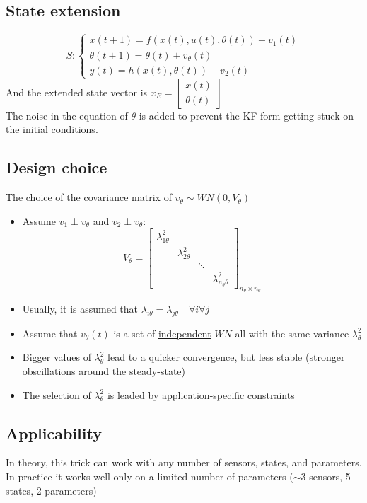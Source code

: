 \documentclass{report}
\begin{document}
\subsection{State extension}
\[
S:\begin{cases}
x(t+1)=f(x(t),u(t),\theta(t))+v_1(t)\\
\theta(t+1)=\theta(t)+v_\theta(t)\\
y(t)=h(x(t),\theta(t))+v_2(t)
\end{cases}
\]
And the extended state vector is $x_E=\begin{bmatrix}
x(t)\\\theta(t)
\end{bmatrix}
$\\
The noise in the equation of $\theta$ is added to prevent the KF form getting stuck on the initial conditions.
\subsection{Design choice} The choice of the covariance matrix of $v_\theta\sim WN(0,V_\theta)$\\
\begin{itemize}
\item Assume $v_1\perp v_\theta$ and $v_2\perp v_\theta$:
\[
V_\theta=\begin{bmatrix}
\lambda_{1\theta}^2\\
&\lambda_{2\theta}^2\\
&&\ddots\\
&&&\lambda_{n_\theta \theta}^2
\end{bmatrix}_{n_\theta \times n_\theta}
\]
\item Usually, it is assumed that $\lambda_{i\theta}=\lambda_{j\theta} \quad \forall i \forall j$
\item Assume that $v_\theta(t)$ is a set of \underline{independent} $WN$ all with the same variance $\lambda_\theta^2$
\item Bigger values of $\lambda_\theta^2$ lead to a quicker convergence, but less stable (stronger obscillations around the steady-state)
\item The selection of $\lambda_\theta^2$ is leaded by application-specific constraints
\end{itemize}
\subsection{Applicability} In theory, this trick can work with any number of sensors, states, and parameters. In practice it works well only on a limited number of parameters ($\sim$3 sensors, 5 states, 2 parameters)
\end{document}
